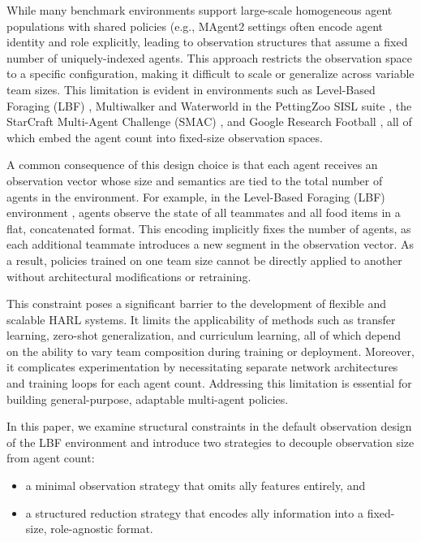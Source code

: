 \documentclass{article}
\begin{document}
While many benchmark environments support large-scale homogeneous agent populations with
shared policies (e.g., MAgent2 %
settings often encode agent identity and role explicitly, leading to observation structures
that assume a fixed number of uniquely-indexed agents. This approach restricts the observation
space to a specific configuration, making it difficult to scale or generalize across variable
team sizes. This limitation is evident in environments such as Level-Based Foraging (LBF)
\cite{papoudakis2021}, Multiwalker and Waterworld in the PettingZoo SISL suite
\cite{terry2021}, the StarCraft Multi-Agent Challenge (SMAC) \cite{samvelyan2019}, 
and Google Research Football \cite{kurach2020}, 
all of which embed the agent count into fixed-size observation spaces.

A common consequence of this design choice is that each agent receives an observation vector
whose size and semantics are tied to the total number of agents in the environment. 
For example, in the Level-Based Foraging (LBF) environment \cite{papoudakis2021}, 
agents observe the state of all teammates and all food items in a flat, concatenated format. 
This encoding implicitly fixes the number of agents, as each additional teammate introduces 
a new segment in the observation vector. As a result, policies trained on one team size cannot 
be directly applied to another without architectural modifications or retraining.

This constraint poses a significant barrier to the development of flexible and scalable HARL 
systems. It limits the applicability of methods such as transfer learning, 
zero-shot generalization, and curriculum learning, all of which depend on the ability 
to vary team composition during training or deployment. 
Moreover, it complicates experimentation by necessitating separate network architectures and 
training loops for each agent count. Addressing this limitation is essential for building 
general-purpose, adaptable multi-agent policies.

In this paper, we examine structural constraints in the default observation design of the
LBF environment and introduce two strategies to decouple observation size from agent count:
\begin{itemize}
    \item a minimal observation strategy that omits ally features entirely, and
    \item a structured reduction strategy that encodes ally information into a fixed-size,
    role-agnostic format.
\end{itemize}
\end{document}
